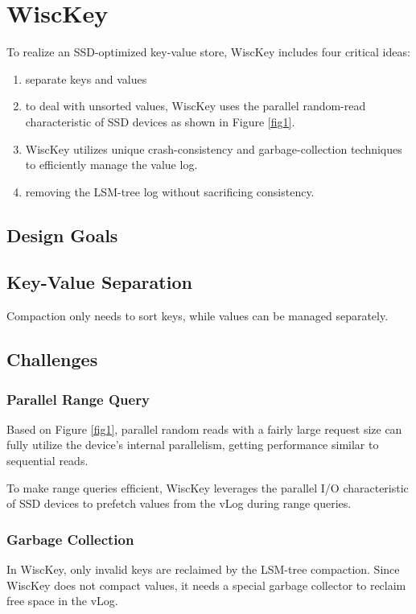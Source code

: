 \documentclass[11pt]{article}
\begin{document}
\section{WiscKey}
\label{sec:orge7a286c}
To realize an SSD-optimized key-value store, WiscKey includes four critical ideas:
\begin{enumerate}
\item separate keys and values
\item to deal with unsorted values, WiscKey uses the parallel random-read characteristic of SSD devices
as shown in Figure \ref{fig1}.
\item WiscKey utilizes unique crash-consistency and garbage-collection techniques to efficiently manage
the value log.
\item removing the LSM-tree log without sacrificing consistency.
\end{enumerate}
\subsection{Design Goals}
\label{sec:orgf1c3f5a}
\subsection{Key-Value Separation}
\label{sec:org7be21a8}
Compaction only needs to sort keys, while values can be managed separately.
\subsection{Challenges}
\label{sec:orgd6e255e}
\subsubsection{Parallel Range Query}
\label{sec:org6cba5ac}
Based on Figure \ref{fig1}, parallel random reads with a fairly large request size can fully utilize the
device's internal parallelism, getting performance similar to sequential reads.

To make range queries efﬁcient, WiscKey leverages the parallel I/O characteristic of SSD devices to
prefetch values from the vLog during range queries.
\subsubsection{Garbage Collection}
\label{sec:orgb21fa57}
In WiscKey, only invalid keys are reclaimed by the LSM-tree compaction. Since WiscKey does not compact
values, it needs a special garbage collector to reclaim free space in the vLog.
\end{document}
